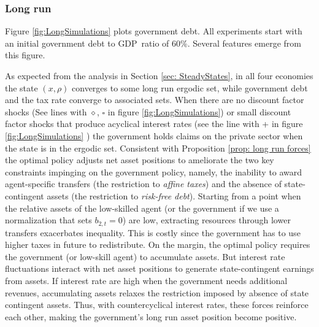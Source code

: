 \documentclass[thmsb,11pt]{article}
\begin{document}
\subsubsection{Long run}

Figure \ref{fig:LongSimulations} plots government  debt. All
experiments start with an initial government debt to GDP\ ratio of 60\%. Several
features emerge from this figure. %




\smallskip


As expected from the analysis in  Section \ref{sec: SteadyStates}, in all four economies the state $(x,\rho)$   converges to some long run
ergodic set, while government debt and the tax rate converge to associated sets. When there are no discount factor shocks
(See lines with {$\diamond$, \scriptsize  $\square$ \normalsize}in figure \ref{fig:LongSimulations}) or small discount factor shocks that produce acyclical interest rates (see the line with + in figure \ref{fig:LongSimulations} )
the government holds claims on the private sector when the state is  in the ergodic set. Consistent with Proposition \ref{prop: long run forces} %
 the optimal policy adjusts  net asset
positions to ameliorate the two key constraints impinging  on the government policy, namely,
the inability to award agent-specific transfers (the restriction to \emph{affine taxes}) and the  absence of state-contingent assets (the
restriction to \emph {risk-free debt}). Starting from a point when the
relative assets of the low-skilled agent (or the government if we use a
 normalization that sets $b_{2,t} = 0$) are low, extracting resources through lower
transfers exacerbates inequality. This is costly since the government has to
use higher taxes in future to redistribute. On the margin, the optimal policy requires the government (or low-skill agent) to accumulate assets. But  interest rate
fluctuations interact with net asset positions to generate state-contingent  earnings
from assets. If interest rate are high when the government needs additional
revenues, accumulating assets relaxes the restriction imposed by absence
of state contingent assets. Thus, with countercyclical interest rates, these
forces reinforce each other, making the government's  long run asset position become positive.
\end{document}
